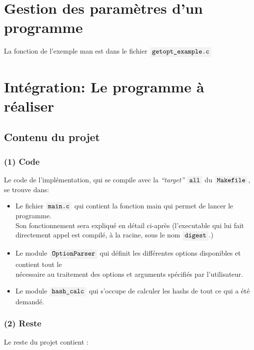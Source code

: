 \documentclass[draft, french]{article}
\newcommand{\code}[1]{$\mbox{\colorbox{light-gray}{\texttt{#1}}}$}
\newcommand{\quo}[1]{``{#1}''}
\begin{document}
\section{Gestion des paramètres d'un programme}
\vspace{0.3cm}

La fonction de l'exemple man est dans le fichier \code{getopt\_example.c}

\vspace{0.3cm}
\section{Intégration: Le programme à réaliser}
\subsection{Contenu du projet}

\subsubsection*{(1) Code}

Le code de l'implémentation, qui se compile avec la
\textit{\quo{target}} \code{all} du \code{Makefile}, se trouve dans:
\begin{itemize}
    \item Le fichier \code{main.c} qui contient la fonction main qui permet de lancer le programme.\\
    Son fonctionnement sera expliqué en détail ci-après
    (l'executable qui lui fait directement appel est compilé, à la racine, sous le nom \code{digest}.)
    
    \item Le module \code{OptionParser} qui définit les différentes options disponibles et contient tout le\\ nécessaire au traitement des options et arguments spécifiés par l'utilisateur.
    
    \item Le module \code{hash\_calc} qui s'occupe de calculer les hashs de tout ce qui a été demandé. 
\end{itemize}

\newpage

\subsubsection*{(2) Reste}
Le reste du projet contient :
\end{document}
